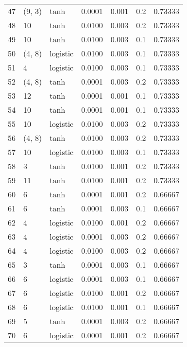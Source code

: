 \begin{tabular}{lllrrrr}
47  &      (9, 3) &      tanh &  0.0001 &  0.001 &  0.2 &   0.73333 \\
48  &          10 &      tanh &  0.0100 &  0.003 &  0.2 &   0.73333 \\
49  &          10 &      tanh &  0.0100 &  0.003 &  0.1 &   0.73333 \\
50  &      (4, 8) &  logistic &  0.0100 &  0.003 &  0.1 &   0.73333 \\
51  &           4 &  logistic &  0.0100 &  0.003 &  0.1 &   0.73333 \\
52  &      (4, 8) &      tanh &  0.0001 &  0.003 &  0.2 &   0.73333 \\
53  &          12 &      tanh &  0.0001 &  0.001 &  0.1 &   0.73333 \\
54  &          10 &      tanh &  0.0001 &  0.001 &  0.1 &   0.73333 \\
55  &          10 &  logistic &  0.0100 &  0.003 &  0.2 &   0.73333 \\
56  &      (4, 8) &      tanh &  0.0100 &  0.003 &  0.2 &   0.73333 \\
57  &          10 &  logistic &  0.0100 &  0.003 &  0.1 &   0.73333 \\
58  &           3 &      tanh &  0.0100 &  0.001 &  0.2 &   0.73333 \\
59  &          11 &      tanh &  0.0100 &  0.001 &  0.2 &   0.73333 \\
60  &           6 &      tanh &  0.0001 &  0.001 &  0.2 &   0.66667 \\
61  &           6 &      tanh &  0.0001 &  0.003 &  0.1 &   0.66667 \\
62  &           4 &  logistic &  0.0100 &  0.001 &  0.2 &   0.66667 \\
63  &           4 &  logistic &  0.0001 &  0.003 &  0.2 &   0.66667 \\
64  &           4 &  logistic &  0.0100 &  0.003 &  0.2 &   0.66667 \\
65  &           3 &      tanh &  0.0001 &  0.003 &  0.1 &   0.66667 \\
66  &           6 &  logistic &  0.0001 &  0.003 &  0.1 &   0.66667 \\
67  &           6 &  logistic &  0.0100 &  0.001 &  0.2 &   0.66667 \\
68  &           6 &  logistic &  0.0100 &  0.001 &  0.1 &   0.66667 \\
69  &           5 &      tanh &  0.0001 &  0.003 &  0.2 &   0.66667 \\
70  &           6 &  logistic &  0.0001 &  0.001 &  0.2 &   0.66667 \\

\end{tabular}
